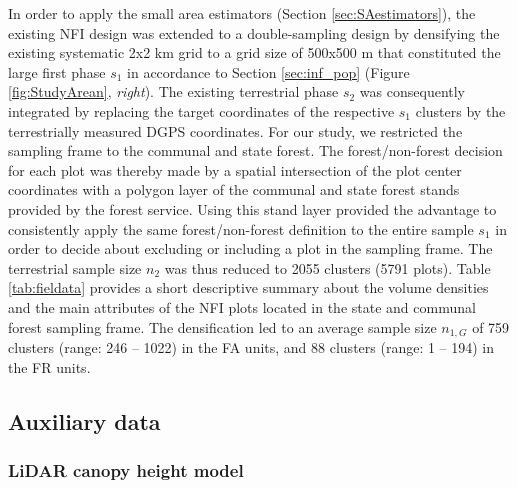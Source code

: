 In order to apply the small area estimators (Section \ref{sec:SAestimators}), the existing NFI design was extended to a double-sampling design by densifying the existing systematic 2x2 km grid to a grid size of 500x500 m that constituted the large first phase $s_1$ in accordance to Section \ref{sec:inf_pop} (Figure \ref{fig:StudyArean}, \textit{right}). The existing terrestrial phase $s_2$ was consequently integrated by replacing the target coordinates of the respective $s_1$ clusters by the terrestrially measured DGPS coordinates. For our study, we restricted the sampling frame to the communal and state forest. The forest/non-forest decision for each plot was thereby made by a spatial intersection of the plot center coordinates with a polygon layer of the communal and state forest stands provided by the forest service. Using this stand layer provided the advantage to consistently apply the same forest/non-forest definition to the entire sample $s_1$ in order to decide about excluding or including a plot in the sampling frame. The terrestrial sample size $n_2$ was thus reduced to 2055 clusters (5791 plots). Table \ref{tab:fieldata} provides a short descriptive summary about the volume densities and the main attributes of the NFI plots located in the state and communal forest sampling frame. The densification led to an average sample size $n_{1,G}$ of 759  clusters (range: 246 -- 1022) in the FA units, and 88 clusters (range: 1 -- 194) in the FR units.




\subsection{Auxiliary data}
\label{sec:auxinfo}

\subsubsection{LiDAR canopy height model}
\label{sec:chm}

